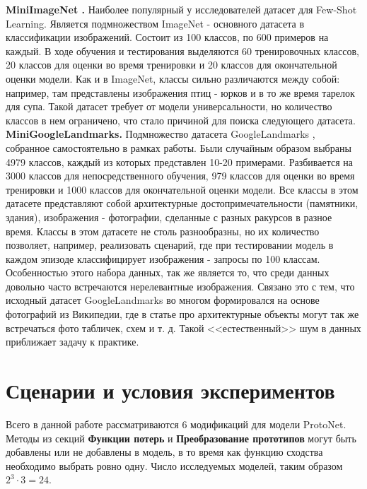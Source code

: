 \documentclass[a4paper, 12pt]{report}
\begin{document}
\textbf {MiniImageNet \cite{imagenet}.} Наиболее популярный у исследователей датасет для Few-Shot Learning. Является подмножеством ImageNet - основного датасета в классификации изображений. Состоит из 100 классов, по 600 примеров на каждый. В ходе обучения и тестирования выделяются 60 тренировочных классов, 20 классов для оценки во время тренировки и 20 классов для окончательной оценки модели. Как и в ImageNet, классы сильно различаются между собой: например, там представлены изображения птиц - юрков и в то же время тарелок для супа. Такой датасет требует от модели универсальности, но количество классов в нем ограничено, что стало причиной для поиска следующего датасета. \\

\textbf {MiniGoogleLandmarks.} Подмножество датасета GoogleLandmarks \cite{google}, собранное самостоятельно в рамках работы. Были случайным образом выбраны 4979 классов, каждый из которых представлен 10-20 примерами. Разбивается на 3000 классов для непосредственного обучения, 979 классов для оценки во время тренировки и 1000 классов для окончательной оценки модели. Все классы в этом датасете представляют собой архитектурные достопримечательности (памятники, здания), изображения - фотографии, сделанные с разных ракурсов в разное время. Классы в этом датасете не столь разнообразны, но их количество позволяет, например, реализовать сценарий, где при тестировании модель в каждом эпизоде классифицирует изображения - запросы по 100 классам. Особенностью этого набора данных, так же является то, что среди данных довольно часто встречаются нерелевантные изображения. Связано это с тем, что исходный датасет GoogleLandmarks во многом формировался на основе фотографий из Википедии, где в статье про архитектурные объекты могут так же встречаться фото табличек, схем и т. д. Такой <<естественный>> шум в данных приближает задачу к практике.

\section {Сценарии и условия экспериментов}

Всего в данной работе рассматриваются 6 модификаций для модели ProtoNet. Методы из секций \textbf{Функции потерь} и \textbf{Преобразование прототипов} могут быть добавлены или не добавлены в модель, в то время как функцию сходства необходимо выбрать ровно одну. Число исследуемых моделей, таким образом $2^3 \cdot 3 = 24$.\\
\end{document}
